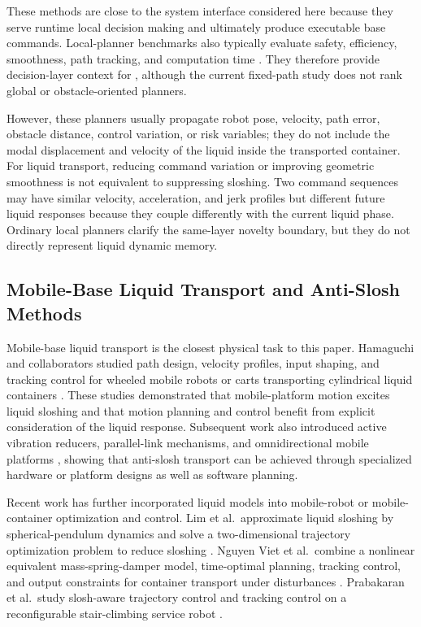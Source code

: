 These methods are close to the system interface considered here because they serve runtime local decision making and ultimately produce executable base commands.
Local-planner benchmarks also typically evaluate safety, efficiency, smoothness, path tracking, and computation time \cite{D21_Wen2021}.
They therefore provide decision-layer context for \SMPCC{}, although the current fixed-path study does not rank global or obstacle-oriented planners.

However, these planners usually propagate robot pose, velocity, path error, obstacle distance, control variation, or risk variables; they do not include the modal displacement and velocity of the liquid inside the transported container.
For liquid transport, reducing command variation or improving geometric smoothness is not equivalent to suppressing sloshing.
Two command sequences may have similar velocity, acceleration, and jerk profiles but different future liquid responses because they couple differently with the current liquid phase.
Ordinary local planners clarify the same-layer novelty boundary, but they do not directly represent liquid dynamic memory.

\subsection{Mobile-Base Liquid Transport and Anti-Slosh Methods}

Mobile-base liquid transport is the closest physical task to this paper.
Hamaguchi and collaborators studied path design, velocity profiles, input shaping, and tracking control for wheeled mobile robots or carts transporting cylindrical liquid containers \cite{B04_Hamaguchi2002,B03_Hamaguchi2004,B02_Hamaguchi2005}.
These studies demonstrated that mobile-platform motion excites liquid sloshing and that motion planning and control benefit from explicit consideration of the liquid response.
Subsequent work also introduced active vibration reducers, parallel-link mechanisms, and omnidirectional mobile platforms \cite{B05_Hamaguchi2019,B06_Hamaguchi2018,B07_Nguyen2024,B08_Yuan2020}, showing that anti-slosh transport can be achieved through specialized hardware or platform designs as well as software planning.

Recent work has further incorporated liquid models into mobile-robot or mobile-container optimization and control.
Lim et al.\ approximate liquid sloshing by spherical-pendulum dynamics and solve a two-dimensional trajectory optimization problem to reduce sloshing \cite{B01_Lim2024}.
Nguyen Viet et al.\ combine a nonlinear equivalent mass-spring-damper model, time-optimal planning, tracking control, and output constraints for container transport under disturbances \cite{B11_Viet2025}.
Prabakaran et al.\ study slosh-aware trajectory control and \MPC{} tracking control on a reconfigurable stair-climbing service robot \cite{B12_Prabakaran2026}.

